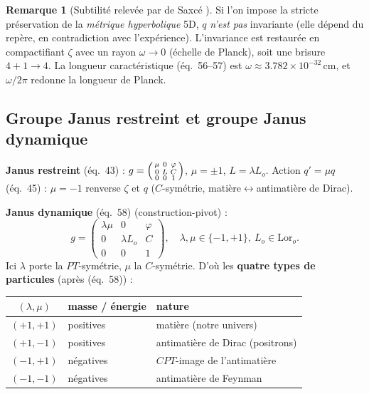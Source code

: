 \documentclass[11pt,a4paper]{article}
\theoremstyle{definition}
\newtheorem{remarque}{Remarque}[section]
\theoremstyle{plain}
\newcommand{\Lor}{\mathrm{Lor}}
\newcommand{\eqpaper}[1]{\textsf{(éq.~#1)}}   %
\begin{document}
\begin{remarque}[Subtilité relevée par de Saxcé \cite{deSaxce2024}]
Si l'on impose la stricte préservation de la \emph{métrique hyperbolique} 5D, $q$ \emph{n'est
pas} invariante (elle dépend du repère, en contradiction avec l'expérience). L'invariance est
restaurée en compactifiant $\zeta$ avec un rayon $\omega\to0$ (échelle de Planck), soit une
brisure $4{+}1\to4$. La longueur caractéristique \eqpaper{56--57} est
$\omega\approx 3.782\times10^{-32}\,\mathrm{cm}$, et $\omega/2\pi$ redonne la longueur de Planck.
\end{remarque}

\subsection{Groupe Janus restreint et groupe Janus dynamique}

\textbf{Janus restreint} \eqpaper{43} :
$g=\begin{psmallmatrix}\mu&0&\varphi\\0&L&C\\0&0&1\end{psmallmatrix}$, $\mu=\pm1$,
$L=\lambda L_o$. Action $q'=\mu q$ \eqpaper{45} : $\mu=-1$ renverse $\zeta$ et $q$
($C$-symétrie, matière$\leftrightarrow$antimatière de Dirac).

\textbf{Janus dynamique} \eqpaper{58} (construction-pivot) :
\begin{equation}
g=\begin{pmatrix}\lambda\mu & 0 & \varphi\\ 0 & \lambda L_o & C\\ 0 & 0 & 1\end{pmatrix},
\quad \lambda,\mu\in\{-1,+1\},\ L_o\in\Lor_o.
\label{eq:janusdyn}
\end{equation}
Ici $\lambda$ porte la $PT$-symétrie, $\mu$ la $C$-symétrie. D'où les \textbf{quatre types de
particules} (après \eqpaper{58}) :
\begin{center}
\begin{tabular}{cll}
\toprule
$(\lambda,\mu)$ & masse / énergie & nature\\
\midrule
$(+1,+1)$ & positives & matière (notre univers)\\
$(+1,-1)$ & positives & antimatière de Dirac (positrons)\\
$(-1,+1)$ & négatives & $CPT$-image de l'antimatière\\
$(-1,-1)$ & négatives & antimatière de Feynman\\
\bottomrule
\end{tabular}
\end{center}
\end{document}
